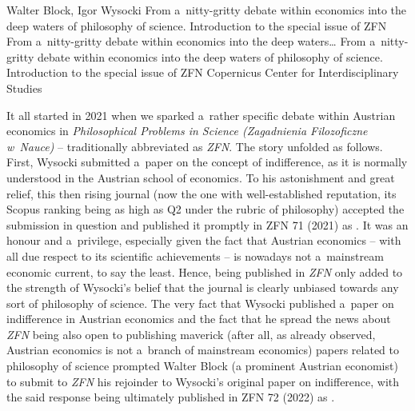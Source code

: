 \begin{editorialeng}{Walter Block, Igor Wysocki}
	{From a~nitty-gritty debate within economics into the deep waters of philosophy of science.
	Introduction to the special issue of ZFN}
	{From a~nitty-gritty debate within economics into the deep waters\ldots}
	{From a~nitty-gritty debate within economics into the deep waters of philosophy of science.
	Introduction to the special issue of ZFN}
	{Copernicus Center for Interdisciplinary Studies}









It all started in 2021 when we sparked a~rather specific debate within Austrian economics in \textit{Philosophical Problems in Science (Zagadnienia Filozoficzne w~Nauce)} – traditionally abbreviated as \textit{ZFN}. The story unfolded as follows. First, Wysocki submitted a~paper on the concept of indifference, as it is normally understood in the Austrian school of economics. To his astonishment and great relief, this then rising journal (now the one with well-established reputation, its Scopus ranking being as high as Q2 under the rubric of philosophy) accepted the submission in question and published it promptly in ZFN 71 (2021) as 
\parencite[][]{wysocki_problem_2021}. %
 It was an honour and a~privilege, especially given the fact that Austrian economics -- with all due respect to its scientific achievements -- is nowadays not a~mainstream economic current, to say the least. Hence, being published in \textit{ZFN} only added to the strength of Wysocki's belief that the journal is clearly unbiased towards any sort of philosophy of science. The very fact that Wysocki published a~paper on indifference in Austrian economics and the fact that he spread the news about \textit{ZFN} being also open to publishing maverick (after all, as already observed, Austrian economics is not a~branch of mainstream economics) papers related to philosophy of science prompted Walter Block (a prominent Austrian economist) to submit to \textit{ZFN} his rejoinder to Wysocki's original paper on indifference, with the said response being ultimately published in ZFN 72 (2022) as 
\parencite[][]{block_response_2022}.%





\end{editorialeng}
